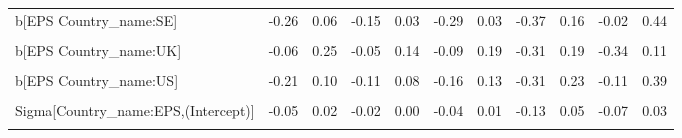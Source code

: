 \begin{table}
\begin{tabular}[t]{lrrrrrrrrrr}
b[EPS Country\_name:SE] & -0.26 & 0.06 & -0.15 & 0.03 & -0.29 & 0.03 & -0.37 & 0.16 & -0.02 & 0.44\\
\cellcolor{gray!10}{b[(Intercept) Country\_name:UK]} & \cellcolor{gray!10}{-0.30} & \cellcolor{gray!10}{0.59} & \cellcolor{gray!10}{-0.18} & \cellcolor{gray!10}{0.34} & \cellcolor{gray!10}{-0.31} & \cellcolor{gray!10}{0.48} & \cellcolor{gray!10}{-0.72} & \cellcolor{gray!10}{0.64} & \cellcolor{gray!10}{-0.79} & \cellcolor{gray!10}{0.44}\\
b[EPS Country\_name:UK] & -0.06 & 0.25 & -0.05 & 0.14 & -0.09 & 0.19 & -0.31 & 0.19 & -0.34 & 0.11\\
\cellcolor{gray!10}{b[(Intercept) Country\_name:US]} & \cellcolor{gray!10}{-0.49} & \cellcolor{gray!10}{0.29} & \cellcolor{gray!10}{-0.25} & \cellcolor{gray!10}{0.20} & \cellcolor{gray!10}{-0.36} & \cellcolor{gray!10}{0.33} & \cellcolor{gray!10}{-0.68} & \cellcolor{gray!10}{0.59} & \cellcolor{gray!10}{-0.36} & \cellcolor{gray!10}{0.83}\\
b[EPS Country\_name:US] & -0.21 & 0.10 & -0.11 & 0.08 & -0.16 & 0.13 & -0.31 & 0.23 & -0.11 & 0.39\\
\cellcolor{gray!10}{Sigma[Country\_name:(Intercept),(Intercept)]} & \cellcolor{gray!10}{0.00} & \cellcolor{gray!10}{0.35} & \cellcolor{gray!10}{0.00} & \cellcolor{gray!10}{0.11} & \cellcolor{gray!10}{0.00} & \cellcolor{gray!10}{0.24} & \cellcolor{gray!10}{0.00} & \cellcolor{gray!10}{1.04} & \cellcolor{gray!10}{0.00} & \cellcolor{gray!10}{0.65}\\
Sigma[Country\_name:EPS,(Intercept)] & -0.05 & 0.02 & -0.02 & 0.00 & -0.04 & 0.01 & -0.13 & 0.05 & -0.07 & 0.03\\
\cellcolor{gray!10}{Sigma[Country\_name:EPS,EPS]} & \cellcolor{gray!10}{0.00} & \cellcolor{gray!10}{0.06} & \cellcolor{gray!10}{0.00} & \cellcolor{gray!10}{0.02} & \cellcolor{gray!10}{0.00} & \cellcolor{gray!10}{0.05} & \cellcolor{gray!10}{0.01} & \cellcolor{gray!10}{0.20} & \cellcolor{gray!10}{0.00} & \cellcolor{gray!10}{0.13}\\
\bottomrule
\end{tabular}
\end{table}
